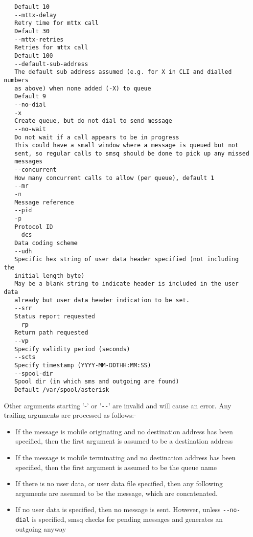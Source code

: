 \begin{verbatim}
   Default 10
   --mttx-delay
   Retry time for mttx call
   Default 30
   --mttx-retries
   Retries for mttx call
   Default 100
   --default-sub-address
   The default sub address assumed (e.g. for X in CLI and dialled numbers
   as above) when none added (-X) to queue
   Default 9
   --no-dial
   -x
   Create queue, but do not dial to send message
   --no-wait
   Do not wait if a call appears to be in progress
   This could have a small window where a message is queued but not
   sent, so regular calls to smsq should be done to pick up any missed
   messages
   --concurrent
   How many concurrent calls to allow (per queue), default 1
   --mr
   -n
   Message reference
   --pid
   -p
   Protocol ID
   --dcs
   Data coding scheme
   --udh
   Specific hex string of user data header specified (not including the
   initial length byte)
   May be a blank string to indicate header is included in the user data
   already but user data header indication to be set.
   --srr
   Status report requested
   --rp
   Return path requested
   --vp
   Specify validity period (seconds)
   --scts
   Specify timestamp (YYYY-MM-DDTHH:MM:SS)
   --spool-dir
   Spool dir (in which sms and outgoing are found)
   Default /var/spool/asterisk
\end{verbatim}

   Other arguments starting '-' or '\verb!--!' are invalid and will cause an
   error. Any trailing arguments are processed as follows:-

\begin{itemize}

     \item If the message is mobile originating and no destination address
       has been specified, then the first argument is assumed to be a
       destination address

     \item If the message is mobile terminating and no destination address
       has been specified, then the first argument is assumed to be the
       queue name

     \item If there is no user data, or user data file specified, then any
       following arguments are assumed to be the message, which are
       concatenated.

     \item If no user data is specified, then no message is sent. However,
       unless \verb!--no-dial! is specified, smsq checks for pending messages
       and generates an outgoing anyway
\end{itemize}


